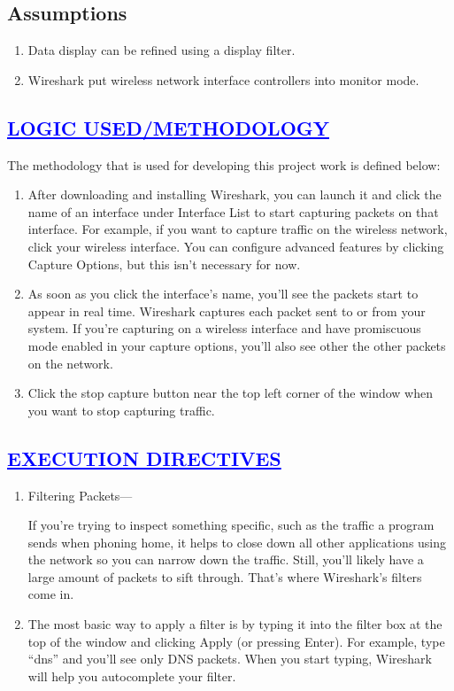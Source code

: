 \documentclass[a4paper,12pt]{report}
\begin{document}
\section*{Assumptions}
\begin{enumerate}
\item Data display can be refined using a display filter.
\item Wireshark  put wireless network interface controllers into monitor mode.

\end{enumerate}
 
\begin{center}
\chapter{\textcolor{blue}{\underline {LOGIC USED/METHODOLOGY}}}
\end{center}
The methodology that is used for developing this project work is defined below:
\begin{enumerate} 
\item After downloading and installing Wireshark, you can launch it and click the name of an interface under Interface List to start capturing packets on that interface. For example, if you want to capture traffic on the wireless network, click your wireless interface. You can configure advanced features by clicking Capture Options, but this isn’t necessary for now.
\item As soon as you click the interface’s name, you’ll see the packets start to appear in real time. Wireshark captures each packet sent to or from your system. If you’re capturing on a wireless interface and have promiscuous mode enabled in your capture options, you’ll also see other the other packets on the network.
\item Click the stop capture button near the top left corner of the window when you want to stop capturing traffic.

\end{enumerate}
\begin{center}
\chapter{\textcolor{blue}{\underline {EXECUTION DIRECTIVES}}}\end{center}
\begin{enumerate}
 \item  Filtering Packets---

If you’re trying to inspect something specific, such as the traffic a program sends when phoning home, it helps to close down all other applications using the network so you can narrow down the traffic. Still, you’ll likely have a large amount of packets to sift through. That’s where Wireshark’s filters come in.

\item The most basic way to apply a filter is by typing it into the filter box at the top of the window and clicking Apply (or pressing Enter). For example, type “dns” and you’ll see only DNS packets. When you start typing, Wireshark will help you autocomplete your filter.



\end{enumerate}
\end{document}
